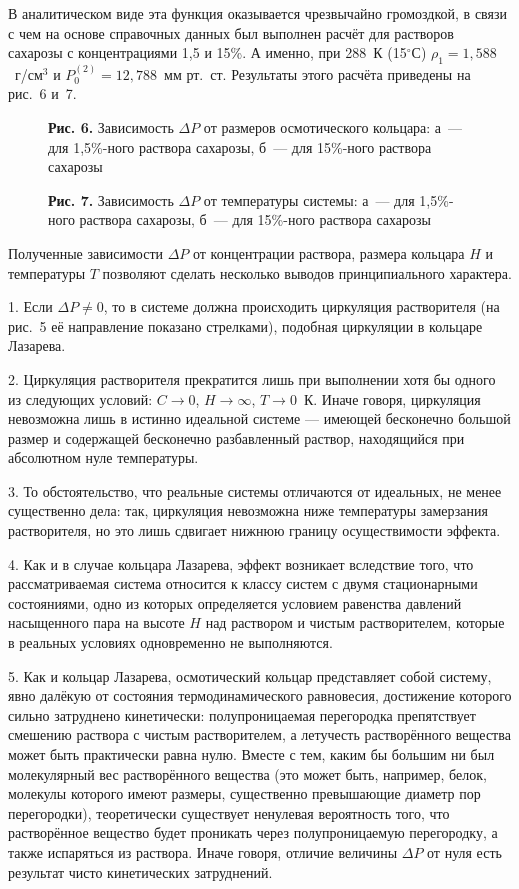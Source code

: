 \documentclass[12pt,a4paper]{article}
\begin{document}
В аналитическом виде эта функция оказывается чрезвычайно громоздкой, в связи
с чем на основе справочных данных был выполнен расчёт для растворов сахарозы
с концентрациями 1,5 и 15\%. А именно, при 288~К (15$^{\circ}$С) $\rho_1 = 1{,}588$~г/см$^3$
и $P_0^{(2)} = 12{,}788$~мм рт.~ст. Результаты этого расчёта приведены на
рис.~6 и~7.

\begin{figure}[h]
\centering
\caption*{\textbf{Рис. 6.} Зависимость $\Delta P$ от размеров осмотического
кольцара: а~— для 1,5\%-ного раствора сахарозы, б~— для 15\%-ного раствора
сахарозы}
\end{figure}

\begin{figure}[h]
\centering
\caption*{\textbf{Рис. 7.} Зависимость $\Delta P$ от температуры системы:
а~— для 1,5\%-ного раствора сахарозы, б~— для 15\%-ного раствора сахарозы}
\end{figure}

Полученные зависимости $\Delta P$ от концентрации раствора, размера кольцара
$H$ и температуры $T$ позволяют сделать несколько выводов принципиального
характера.

1. Если $\Delta P \neq 0$, то в системе должна происходить циркуляция
растворителя (на рис.~5 её направление показано стрелками), подобная циркуляции
в кольцаре Лазарева.

2. Циркуляция растворителя прекратится лишь при выполнении хотя бы одного из
следующих условий: $C \to 0$, $H \to \infty$, $T \to 0$~К. Иначе говоря,
циркуляция невозможна лишь в истинно идеальной системе — имеющей бесконечно
большой размер и содержащей бесконечно разбавленный раствор, находящийся при
абсолютном нуле температуры.

3. То обстоятельство, что реальные системы отличаются от идеальных, не менее
существенно дела: так, циркуляция невозможна ниже температуры замерзания
растворителя, но это лишь сдвигает нижнюю границу осуществимости эффекта.

4. Как и в случае кольцара Лазарева, эффект возникает вследствие того, что
рассматриваемая система относится к классу систем с двумя стационарными
состояниями, одно из которых определяется условием равенства давлений
насыщенного пара на высоте $H$ над раствором и чистым растворителем, которые
в реальных условиях одновременно не выполняются.

5. Как и кольцар Лазарева, осмотический кольцар представляет собой систему,
явно далёкую от состояния термодинамического равновесия, достижение которого
сильно затруднено кинетически: полупроницаемая перегородка препятствует
смешению раствора с чистым растворителем, а летучесть растворённого вещества
может быть практически равна нулю. Вместе с тем, каким бы большим ни был
молекулярный вес растворённого вещества (это может быть, например, белок,
молекулы которого имеют размеры, существенно превышающие диаметр пор
перегородки), теоретически существует ненулевая вероятность того, что
растворённое вещество будет проникать через полупроницаемую перегородку, а
также испаряться из раствора. Иначе говоря, отличие величины $\Delta P$ от нуля
есть результат чисто кинетических затруднений.
\end{document}
